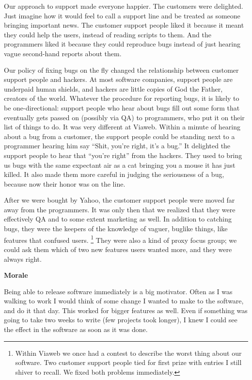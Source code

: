\documentclass[12pt]{book}
\begin{document}
Our approach to support made everyone happier. The customers were
delighted. Just imagine how it would feel to call a support line and be
treated as someone bringing important news. The customer support people
liked it because it meant they could help the users, instead of reading
scripts to them. And the programmers liked it because they could
reproduce bugs instead of just hearing vague second-hand reports about
them.

Our policy of fixing bugs on the fly changed the relationship between
customer support people and hackers. At most software companies, support
people are underpaid human shields, and hackers are little copies of God
the Father, creators of the world. Whatever the procedure for reporting
bugs, it is likely to be one-directional: support people who hear about
bugs fill out some form that eventually gets passed on (possibly via QA)
to programmers, who put it on their list of things to do. It was very
different at Viaweb. Within a minute of hearing about a bug from a
customer, the support people could be standing next to a programmer
hearing him say ``Shit, you're right, it's a bug.'' It delighted the
support people to hear that ``you're right'' from the hackers. They used
to bring us bugs with the same expectant air as a cat bringing you a
mouse it has just killed. It also made them more careful in judging the
seriousness of a bug, because now their honor was on the line.

After we were bought by Yahoo, the customer support people were moved
far away from the programmers. It was only then that we realized that
they were effectively QA and to some extent marketing as well. In
addition to catching bugs, they were the keepers of the knowledge of
vaguer, buglike things, like features that confused users. \footnote{Within Viaweb we once had a contest to describe the worst thing
about our software. Two customer support people tied for first prize
with entries I still shiver to recall. We fixed both problems
immediately.} They
were also a kind of proxy focus group; we could ask them which of two
new features users wanted more, and they were always right.

\textbf{Morale}

Being able to release software immediately is a big motivator. Often as
I was walking to work I would think of some change I wanted to make to
the software, and do it that day. This worked for bigger features as
well. Even if something was going to take two weeks to write (few
projects took longer), I knew I could see the effect in the software as
soon as it was done.
\end{document}
